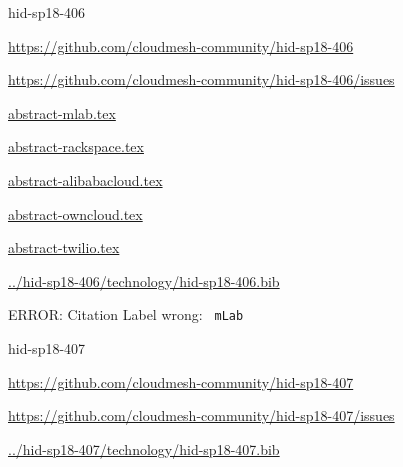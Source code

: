 \begin{IU}

hid-sp18-406

\url{https://github.com/cloudmesh-community/hid-sp18-406}

\url{https://github.com/cloudmesh-community/hid-sp18-406/issues}

\href{https://github.com/cloudmesh-community/hid-sp18-406/blob/master//technology/abstract-mlab.tex}{abstract-mlab.tex}

\href{https://github.com/cloudmesh-community/hid-sp18-406/blob/master//technology/abstract-rackspace.tex}{abstract-rackspace.tex}

\href{https://github.com/cloudmesh-community/hid-sp18-406/blob/master//technology/abstract-alibabacloud.tex}{abstract-alibabacloud.tex}

\href{https://github.com/cloudmesh-community/hid-sp18-406/blob/master//technology/abstract-owncloud.tex}{abstract-owncloud.tex}

\href{https://github.com/cloudmesh-community/hid-sp18-406/blob/master//technology/abstract-twilio.tex}{abstract-twilio.tex}

\href{https://github.com/cloudmesh-community/hid-sp18-406/blob/master//technology/hid-sp18-406.bib}{../hid-sp18-406/technology/hid-sp18-406.bib}

 ERROR: Citation Label wrong: \verb| mLab |

\end{IU}


\begin{IU}

hid-sp18-407

\url{https://github.com/cloudmesh-community/hid-sp18-407}

\url{https://github.com/cloudmesh-community/hid-sp18-407/issues}

\href{https://github.com/cloudmesh-community/hid-sp18-407/blob/master//technology/hid-sp18-407.bib}{../hid-sp18-407/technology/hid-sp18-407.bib}

\end{IU}


